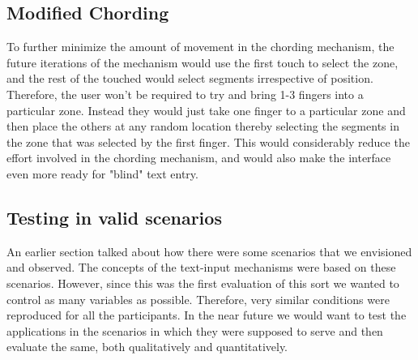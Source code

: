 \subsection{Modified Chording}

To further minimize the amount of movement in the chording mechanism,
the future iterations of the mechanism would use the first touch to
select the zone, and the rest of the touched would select segments
irrespective of position. Therefore, the user won't be required to try
and bring 1-3 fingers into a particular zone. Instead they would just
take one finger to a particular zone and then place the others at any
random location thereby selecting the segments in the zone that was
selected by the first finger. This would considerably reduce the
effort involved in the chording mechanism, and would also make the
interface even more ready for "blind" text entry.

\subsection{Testing in valid scenarios}

An earlier section talked about how there were some scenarios that we
envisioned and observed. The concepts of the text-input mechanisms
were based on these scenarios. However, since this was the first
evaluation of this sort we wanted to control as many variables as
possible. Therefore, very similar conditions were reproduced for all
the participants. In the near future we would want to test the
applications in the scenarios in which they were supposed to serve and
then evaluate the same, both qualitatively and quantitatively.
